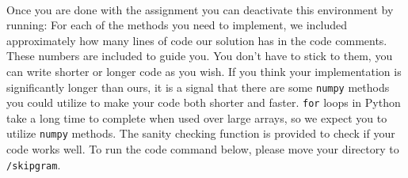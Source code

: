 \documentclass{assignment format}
\begin{document}
\newline \newline
{} \\
\newline \newline
Once you are done with the assignment you can deactivate this environment by running:
\newline \newline
{}
\newline \newline
For each of the methods you need to implement, we included approximately how many lines of code our solution has in the code comments. These numbers are included to guide you. You don't have to stick to them, you can write shorter or longer code as you wish. If you think your implementation is significantly longer than ours, it is a signal that there are some \texttt{numpy} methods you could utilize to make your code both shorter and faster. \texttt{for} loops in Python take a long time to complete when used over large arrays, so we expect you to utilize \texttt{numpy} methods. The sanity checking function is provided to check if your code works well.
\newline
To run the code command below, please move your directory to \texttt{/skipgram}.
\end{document}
